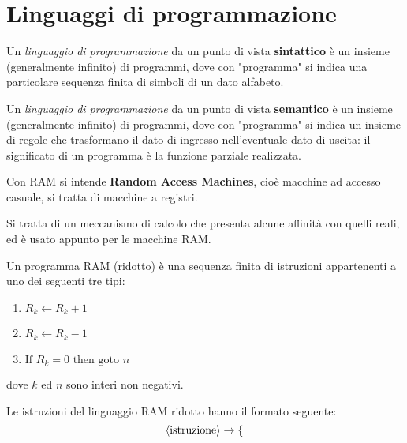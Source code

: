 \documentclass{lectures}
\begin{document}
\chapter{Linguaggi di programmazione}
\begin{multicols}{2}
\begin{definition}
Un \textit{linguaggio di programmazione} da un punto di vista \textbf{sintattico} è un insieme (generalmente infinito) di programmi, dove con "programma" si indica una particolare sequenza finita di simboli di un dato alfabeto.
\end{definition}
\begin{definition}
Un \textit{linguaggio di programmazione} da un punto di vista \textbf{semantico} è un insieme (generalmente infinito) di programmi, dove con "programma" si indica un insieme di regole che trasformano il dato di ingresso nell'eventuale dato di uscita: il significato di un programma è la funzione parziale realizzata.
\end{definition}
\begin{definition}
    Con RAM si intende \textbf{Random Access Machines}, cioè macchine ad accesso casuale, si tratta di macchine a registri.
\end{definition}
\begin{definition}
    Si tratta di un meccanismo di calcolo che presenta alcune affinità con quelli reali, ed è usato appunto per le macchine RAM.
\end{definition}
\begin{definition}
    Un programma RAM (ridotto) è una sequenza finita di istruzioni appartenenti a uno dei seguenti tre tipi:
    \begin{enumerate}
        \item \(R_k \leftarrow R_k + 1\)
        \item \(R_k \leftarrow R_k - 1\)
        \item \(\text{If }R_k=0\text{ then goto }n\)
    \end{enumerate}
    dove \(k\) ed \(n\) sono interi non negativi.
\end{definition}
\begin{definition}
    Le istruzioni del linguaggio RAM ridotto hanno il formato seguente:
    \[\left\langle\text{istruzione}\right\rangle \rightarrow \begin{cases}

\end{cases}\]
\end{definition}
\end{multicols}
\end{document}
